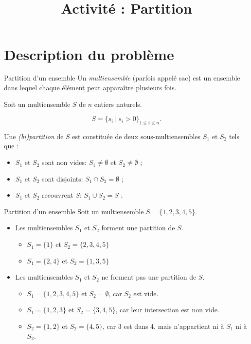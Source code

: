 \documentclass[11pt]{article}
\title{Activité : Partition}
\date{}
\begin{document}
\maketitle
\tableofcontents

\section{Description du problème}

  \begin{definition}{Partition d'un ensemble}
    Un \emph{multiensemble} (parfois appelé sac) est un ensemble dans lequel chaque élément peut apparaître plusieurs fois.

    Soit un multiensemble $S$ de $n$ entiers naturels.

    $$S = \{s_i\ |\ s_i > 0\}_{1\leq i \leq n}.$$

    Une \emph{(bi)partition} de $S$ est constituée de deux sous-multiensembles $S_1$ et $S_2$ tels que :
    \begin{itemize}
      \item $S_1$ et $S_2$ sont non vides:  $S_1 \neq \emptyset$ et $S_2 \neq \emptyset$ ;
      \item $S_1$ et $S_2$ sont disjoints:  $S_1 \cap S_2 = \emptyset$ ;
      \item $S_1$ et $S_2$ recouvrent $S$:  $S_1 \cup S_2 = S$ ;
    \end{itemize}
  \end{definition}

  \begin{exemple}{Partition d'un ensemble}
    Soit un multiensemble $S = \{1,2,3,4,5\}$.
    \begin{itemize}
      \item Les multiensembles $S_1$ et $S_2$ forment une partition de $S$.
        \begin{itemize}
          \item $S_1 = \{1\}$ et $S_2 = \{2,3,4,5\}$
          \item $S_1 = \{2, 4\}$ et $S_2 = \{1,3,5\}$
        \end{itemize}
      \item Les multiensembles $S_1$ et $S_2$ ne forment pas une partition de $S$.
        \begin{itemize}
          \item $S_1 = \{1,2,3,4,5\}$ et $S_2 = \emptyset$, car $S_2$ est vide.
          \item $S_1 = \{1,2,3\}$ et $S_2 = \{3,4,5\}$, car leur intersection est non vide.
          \item $S_2 = \{1,2\}$ et $S_2 = \{4, 5\}$, car 3 est dans 4, mais n'appartient ni à $S_1$ ni à $S_2$.
        \end{itemize}
    \end{itemize}
  \end{exemple}
\end{document}
